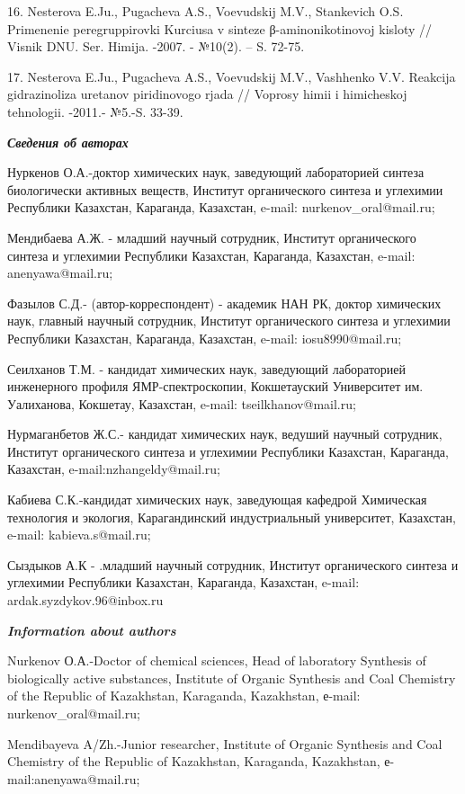16. Nesterova E.Ju., Pugacheva A.S., Voevudskij M.V., Stankevich O.S.
Primenenie peregruppirovki Kurciusa v sinteze β-aminonikotinovoj kisloty
// Visnik DNU. Ser. Himija. -2007. - №10(2). -- S. 72-75.

17. Nesterova E.Ju., Pugacheva A.S., Voevudskij M.V., Vashhenko V.V.
Reakcija gidrazinoliza uretanov piridinovogo rjada // Voprosy himii i
himicheskoj tehnologii. -2011.- №5.-S. 33-39.

\emph{{\bfseries Сведения об авторах}}

Нуркенов О.А.-доктор химических наук, заведующий лабораторией синтеза
биологически активных веществ, Институт органического синтеза и
углехимии Республики Казахстан, Караганда, Казахстан, e-mail:
nurkenov\_oral@mail.ru;

Мендибаева А.Ж. - младший научный сотрудник, Институт органического
синтеза и углехимии Республики Казахстан, Караганда, Казахстан, e-mail:
anenyawa@mail.ru;

Фазылов С.Д.- (автор-корреспондент) - академик НАН РК, доктор химических
наук, главный научный сотрудник, Институт органического синтеза и
углехимии Республики Казахстан, Караганда, Казахстан, e-mail:
iosu8990@mail.ru;

Сеилханов Т.М. - кандидат химических наук, заведующий лабораторией
инженерного профиля ЯМР-спектроскопии, Кокшетауский Университет им.
Уалиханова, Кокшетау, Казахстан, e-mail: tseilkhanov@mail.ru;

Нурмаганбетов Ж.С.- кандидат химических наук, ведуший научный сотрудник,
Институт органического синтеза и углехимии Республики Казахстан,
Караганда, Казахстан, e-mail:nzhangeldy@mail.ru;

Кабиева С.К.-кандидат химических наук, заведующая кафедрой Химическая
технология и экология, Карагандинский индустриальный университет,
Казахстан, e-mail: kabieva.s@mail.ru;

Сыздыков А.К - .младший научный сотрудник, Институт органического
синтеза и углехимии Республики Казахстан, Караганда, Казахстан, e-mail:
ardak.syzdykov.96@inbox.ru

\emph{{\bfseries Information about authors}}

Nurkenov О.А.-Doctor of chemical sciences, Head of laboratory Synthesis
of biologically active substances, Institute of Organic Synthesis and
Coal Chemistry of the Republic of Kazakhstan, Karaganda, Kazakhstan,
е-mail: nurkenov\_oral@mail.ru;

Mendibayeva A/Zh.-Junior researcher, Institute of Organic Synthesis and
Coal Chemistry of the Republic of Kazakhstan, Karaganda, Kazakhstan,
е-mail:anenyawa@mail.ru;

